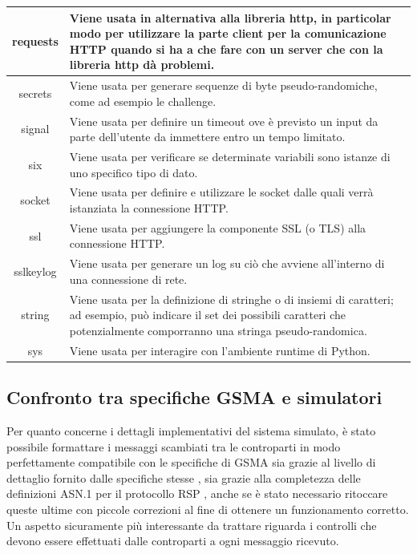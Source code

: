 \documentclass[10pt, oneside]{book}
\begin{document}
\begin{table}[h!]
\begin{center}
\begin{tabularx}{\textwidth}{|c|X|}
\hline
requests & Viene usata in alternativa alla libreria http, in particolar modo per utilizzare la parte client per la comunicazione HTTP quando si ha a che fare con un server che con la libreria http dà problemi.\\
\hline
secrets & Viene usata per generare sequenze di byte pseudo-randomiche, come ad esempio le challenge.\\
\hline
signal & Viene usata per definire un timeout ove è previsto un input da parte dell'utente da immettere entro un tempo limitato.\\
\hline
six & Viene usata per verificare se determinate variabili sono istanze di uno specifico tipo di dato.\\
\hline
socket & Viene usata per definire e utilizzare le socket dalle quali verrà istanziata la connessione HTTP.\\
\hline
ssl & Viene usata per aggiungere la componente SSL (o TLS) alla connessione HTTP.\\
\hline
sslkeylog & Viene usata per generare un log su ciò che avviene all'interno di una connessione di rete.\\
\hline
string & Viene usata per la definizione di stringhe o di insiemi di caratteri; ad esempio, può indicare il set dei possibili caratteri che potenzialmente comporranno una stringa pseudo-randomica.\\
\hline
sys & Viene usata per interagire con l'ambiente runtime di Python.\\
\hline
\end{tabularx}
\end{center}
\end{table}

\subsection{Confronto tra specifiche GSMA e simulatori}
Per quanto concerne i dettagli implementativi del sistema simulato, è stato possibile formattare i messaggi scambiati tra le controparti in modo perfettamente compatibile con le specifiche di GSMA sia grazie al livello di dettaglio fornito dalle specifiche stesse \cite{GSMA-docs-new}, sia grazie alla completezza delle definizioni ASN.1 per il protocollo RSP \cite{RSP-definitions}, anche se è stato necessario ritoccare queste ultime con piccole correzioni al fine di ottenere un funzionamento corretto. Un aspetto sicuramente più interessante da trattare riguarda i controlli che devono essere effettuati dalle controparti a ogni messaggio ricevuto.
\end{document}
